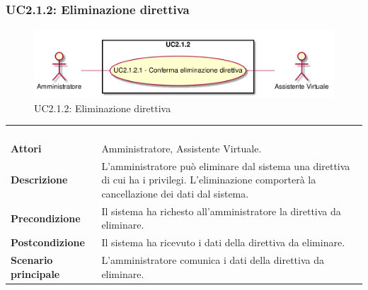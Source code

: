 \newpage\subsubsection{UC2.1.2: Eliminazione direttiva }
\label{UC2.1.2}
\begin{figure}[h]
\centering
\includegraphics[width=\textwidth,height=\textheight,keepaspectratio]{images/UseCaseUC212.png}
\caption{UC2.1.2: Eliminazione direttiva }
\end{figure}
\begin{longtable}{l|p{10cm}}
\rowcolor[gray]{0.8} \multicolumn{2}{c}{} \\
\rowcolor[gray]{0.8} \multicolumn{2}{c}{\textbf{UC2.1.2 - Eliminazione direttiva }} \\
\rowcolor[gray]{0.8} \multicolumn{2}{c}{} \\
\hline
&\\
\textbf{Attori} & Amministratore, Assistente Virtuale.\\[7pt]
\textbf{Descrizione} & L'amministratore può eliminare dal sistema una direttiva di cui ha i privilegi. L'eliminazione comporterà la cancellazione dei dati dal sistema.\\[7pt]
\textbf{Precondizione} & Il sistema ha richesto all'amministratore la direttiva da eliminare.\\[7pt]
\textbf{Postcondizione} & Il sistema ha ricevuto i dati della direttiva da eliminare.\\[7pt]
\textbf{Scenario principale} &L'amministratore comunica i dati della direttiva da eliminare.\\[7pt]\hline
\end{longtable}

